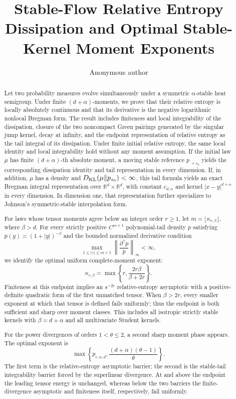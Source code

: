 \documentclass[11pt,reqno]{amsart}
\title[Stable-Flow Entropy Dissipation]{Stable-Flow Relative Entropy
Dissipation and Optimal Stable-Kernel Moment Exponents}
\author{Anonymous author}
\date{}
\theoremstyle{plain}
\theoremstyle{definition}
\numberwithin{equation}{section}
\newcommand{\RR}{\mathbb{R}}
\begin{document}
\begin{abstract}
Let two probability measures evolve simultaneously under a symmetric
\(\alpha\)-stable heat semigroup.  Under finite \((d+\alpha)\)-moments, we
prove that their relative entropy is locally absolutely continuous and that
its derivative is the negative logarithmic nonlocal Bregman form.  The result
includes finiteness and local integrability of the dissipation, closure of the
two noncompact Green pairings generated by the singular jump kernel, decay at
infinity, and the endpoint representation of relative entropy as the tail
integral of its dissipation.  Under finite initial relative entropy, the same
local identity and local integrability hold without any moment assumption.  If
the initial law \(\mu\) has finite \((d+\alpha)\)-th absolute moment, a moving
stable reference \(p_{\mathord\cdot+s_0}\) yields the corresponding dissipation
identity and tail representation in every dimension.  If, in addition, \(\mu\)
has a density and \(D_{\rm KL}(\mu\|p_{s_0})<\infty\), this tail formula yields
an exact Bregman integral representation over \(\RR^d\times\RR^d\), with
constant \(c_{d,\alpha}\) and kernel \(\lvert x-y\rvert^{d+\alpha}\) in every
dimension.  In dimension one,
that representation further specializes to Johnson's symmetric-stable
interpolation form.

For laws whose tensor moments agree below an integer order \(r\ge1\), let
\(m=\lfloor\kappa_{r,\beta}\rfloor\), where \(\beta>d\).  For every strictly
positive \(C^{m+1}\) polynomial-tail density \(p\) satisfying
\(p(y)\asymp(1+|y|)^{-\beta}\) and the bounded normalized derivative condition
\[
 \max_{1\le|\gamma|\le m+1}
 \left\|\frac{\partial^\gamma p}{p}\right\|_\infty<\infty,
\]
we identify the optimal uniform complete-moment exponent:
\[
 \kappa_{r,\beta}=\max\left\{r,
 \frac{2r\beta}{\beta+2r}\right\}.
\]
Finiteness at this endpoint implies an \(s^{-2r}\) relative-entropy
asymptotic with a positive-definite quadratic form of the first unmatched
tensor.  When \(\beta>2r\), every smaller exponent at which that tensor is
defined fails uniformly; thus the endpoint is both sufficient and sharp over
moment classes.  This includes all isotropic strictly stable kernels with
\(\beta=d+\alpha\) and all multivariate Student kernels.

For the power divergences of orders \(1<\theta\le2\), a second sharp
moment phase appears.  The optimal exponent is
\[
 \max\left\{p_{r,\alpha,d},
 \frac{(d+\alpha)(\theta-1)}{\theta}\right\}.
\]
The first term is the relative-entropy asymptotic barrier; the second is
the stable-tail integrability barrier forced by the superlinear divergence.
At and above the endpoint the leading tensor energy is unchanged, whereas
below the two barriers the finite-divergence asymptotic and finiteness
itself, respectively, fail uniformly.


\end{abstract}
\end{document}
